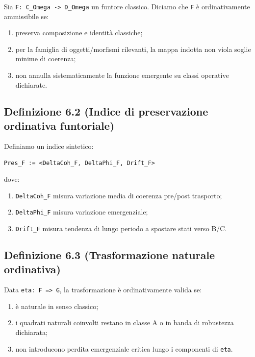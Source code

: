 Sia \texttt{F:\ C\_Omega\ -\textgreater{}\ D\_Omega\textquotesingle{}} un funtore classico. Diciamo che \texttt{F} è ordinativamente ammissibile se:

\begin{enumerate}
\def\labelenumi{\arabic{enumi}.}
\tightlist
\item
  preserva composizione e identità classiche;
\item
  per la famiglia di oggetti/morfismi rilevanti, la mappa indotta non viola soglie minime di coerenza;
\item
  non annulla sistematicamente la funzione emergente su classi operative dichiarate.
\end{enumerate}

\subsection{Definizione 6.2 (Indice di preservazione ordinativa funtoriale)}

Definiamo un indice sintetico:

\texttt{Pres\_F\ :=\ \textless{}DeltaCoh\_F,\ DeltaPhi\_F,\ Drift\_F\textgreater{}}

dove:

\begin{enumerate}
\def\labelenumi{\arabic{enumi}.}
\tightlist
\item
  \texttt{DeltaCoh\_F} misura variazione media di coerenza pre/post trasporto;
\item
  \texttt{DeltaPhi\_F} misura variazione emergenziale;
\item
  \texttt{Drift\_F} misura tendenza di lungo periodo a spostare stati verso B/C.
\end{enumerate}

\subsection{Definizione 6.3 (Trasformazione naturale ordinativa)}

Data \texttt{eta:\ F\ =\textgreater{}\ G}, la trasformazione è ordinativamente valida se:

\begin{enumerate}
\def\labelenumi{\arabic{enumi}.}
\tightlist
\item
  è naturale in senso classico;
\item
  i quadrati naturali coinvolti restano in classe A o in banda di robustezza dichiarata;
\item
  non introducono perdita emergenziale critica lungo i componenti di \texttt{eta}.
\end{enumerate}

